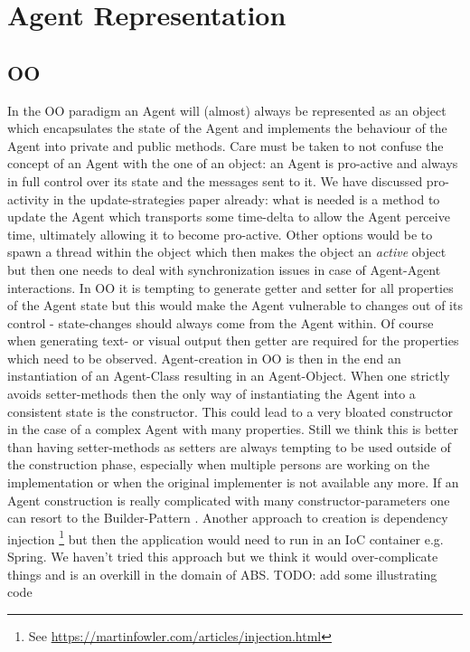 \chapter{Agent Representation}

\section{OO}
In the OO paradigm an Agent will (almost) always be represented as an object which encapsulates the state of the Agent and implements the behaviour of the Agent into private and public methods. Care must be taken to not confuse the concept of an Agent with the one of an object: an Agent is pro-active and always in full control over its state and the messages sent to it. We have discussed pro-activity in the update-strategies paper already: what is needed is a method to update the Agent which transports some time-delta to allow the Agent perceive time, ultimately allowing it to become pro-active. Other options would be to spawn a thread within the object which then makes the object an \textit{active} object but then one needs to deal with synchronization issues in case of Agent-Agent interactions. 
In OO it is tempting to generate getter and setter for all properties of the Agent state but this would make the Agent vulnerable to changes out of its control - state-changes should always come from the Agent within. Of course when generating text- or visual output then getter are required for the properties which need to be observed.
Agent-creation in OO is then in the end an instantiation of an Agent-Class resulting in an Agent-Object. When one strictly avoids setter-methods then the only way of instantiating the Agent into a consistent state is the constructor. This could lead to a very bloated constructor in the case of a complex Agent with many properties. Still we think this is better than having setter-methods as setters are always tempting to be used outside of the construction phase, especially when multiple persons are working on the implementation or when the original implementer is not available any more. If an Agent construction is really complicated with many constructor-parameters one can resort to the Builder-Pattern \cite{bloch_effective_2014}. Another approach to creation is dependency injection \footnote{See \url{https://martinfowler.com/articles/injection.html}} but then the application would need to run in an IoC container e.g. Spring. We haven't tried this approach but we think it would over-complicate things and is an overkill in the domain of ABS. TODO: add some illustrating code

